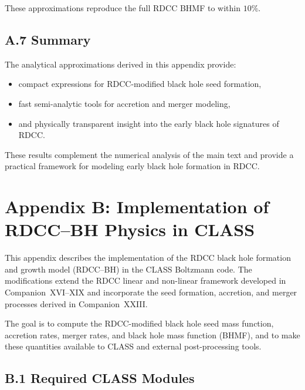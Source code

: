 \documentclass[11pt,a4paper]{article}
\begin{document}
These approximations reproduce the full RDCC BHMF to within $10\%$.

\subsection*{A.7 Summary}

The analytical approximations derived in this appendix provide:

\begin{itemize}
    \item compact expressions for RDCC-modified black hole seed formation,
    \item fast semi-analytic tools for accretion and merger modeling,
    \item and physically transparent insight into the early black hole signatures of RDCC.
\end{itemize}

These results complement the numerical analysis of the main text and provide a practical 
framework for modeling early black hole formation in RDCC.

\section*{Appendix B: Implementation of RDCC–BH Physics in CLASS}

This appendix describes the implementation of the RDCC black hole formation and growth model 
(RDCC–BH) in the CLASS Boltzmann code. The modifications extend the RDCC linear and non-linear 
framework developed in Companion~XVI–XIX and incorporate the seed formation, accretion, and 
merger processes derived in Companion~XXIII.

The goal is to compute the RDCC-modified black hole seed mass function, accretion rates, 
merger rates, and black hole mass function (BHMF), and to make these quantities available to 
CLASS and external post-processing tools.

\subsection*{B.1 Required CLASS Modules}
\end{document}
